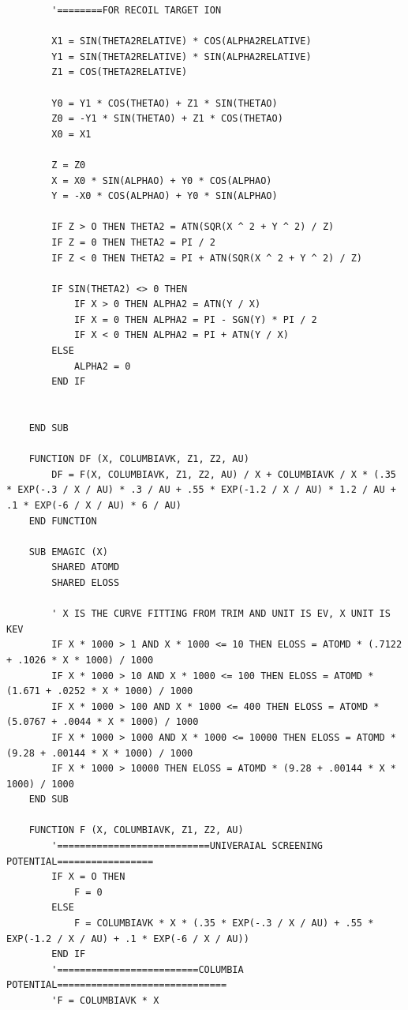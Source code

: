 \documentclass[10pt, reqno]{exam}
\begin{document}
\begin{verbatim}
        '========FOR RECOIL TARGET ION
    
        X1 = SIN(THETA2RELATIVE) * COS(ALPHA2RELATIVE)
        Y1 = SIN(THETA2RELATIVE) * SIN(ALPHA2RELATIVE)
        Z1 = COS(THETA2RELATIVE)
    
        Y0 = Y1 * COS(THETAO) + Z1 * SIN(THETAO)
        Z0 = -Y1 * SIN(THETAO) + Z1 * COS(THETAO)
        X0 = X1
    
        Z = Z0
        X = X0 * SIN(ALPHAO) + Y0 * COS(ALPHAO)
        Y = -X0 * COS(ALPHAO) + Y0 * SIN(ALPHAO)
    
        IF Z > O THEN THETA2 = ATN(SQR(X ^ 2 + Y ^ 2) / Z)
        IF Z = 0 THEN THETA2 = PI / 2
        IF Z < 0 THEN THETA2 = PI + ATN(SQR(X ^ 2 + Y ^ 2) / Z)
    
        IF SIN(THETA2) <> 0 THEN
            IF X > 0 THEN ALPHA2 = ATN(Y / X)
            IF X = 0 THEN ALPHA2 = PI - SGN(Y) * PI / 2
            IF X < 0 THEN ALPHA2 = PI + ATN(Y / X)
        ELSE
            ALPHA2 = 0
        END IF
    
    
    END SUB
    
    FUNCTION DF (X, COLUMBIAVK, Z1, Z2, AU)
        DF = F(X, COLUMBIAVK, Z1, Z2, AU) / X + COLUMBIAVK / X * (.35 * EXP(-.3 / X / AU) * .3 / AU + .55 * EXP(-1.2 / X / AU) * 1.2 / AU + .1 * EXP(-6 / X / AU) * 6 / AU)
    END FUNCTION
    
    SUB EMAGIC (X)
        SHARED ATOMD
        SHARED ELOSS
    
        ' X IS THE CURVE FITTING FROM TRIM AND UNIT IS EV, X UNIT IS KEV
        IF X * 1000 > 1 AND X * 1000 <= 10 THEN ELOSS = ATOMD * (.7122 + .1026 * X * 1000) / 1000
        IF X * 1000 > 10 AND X * 1000 <= 100 THEN ELOSS = ATOMD * (1.671 + .0252 * X * 1000) / 1000
        IF X * 1000 > 100 AND X * 1000 <= 400 THEN ELOSS = ATOMD * (5.0767 + .0044 * X * 1000) / 1000
        IF X * 1000 > 1000 AND X * 1000 <= 10000 THEN ELOSS = ATOMD * (9.28 + .00144 * X * 1000) / 1000
        IF X * 1000 > 10000 THEN ELOSS = ATOMD * (9.28 + .00144 * X * 1000) / 1000
    END SUB
    
    FUNCTION F (X, COLUMBIAVK, Z1, Z2, AU)
        '===========================UNIVERAIAL SCREENING POTENTIAL=================
        IF X = O THEN
            F = 0
        ELSE
            F = COLUMBIAVK * X * (.35 * EXP(-.3 / X / AU) + .55 * EXP(-1.2 / X / AU) + .1 * EXP(-6 / X / AU))
        END IF
        '=========================COLUMBIA POTENTIAL==============================
        'F = COLUMBIAVK * X
    

\end{verbatim}
\end{document}
